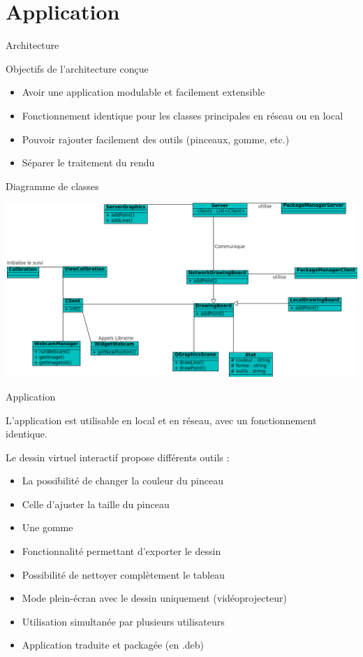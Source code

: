 \documentclass{beamer}
\begin{document}
	\section{Application}
		\begin{frame}{Architecture}
			\begin{block}{Objectifs de l'architecture conçue}
				\begin{itemize}
				\item{Avoir une application modulable et facilement extensible}
				\item{Fonctionnement identique pour les classes principales en réseau ou en local}
				\item{Pouvoir rajouter facilement des outils (pinceaux, gomme, etc.)}
				\item{Séparer le traitement du rendu}
				\end{itemize}
			\end{block}
		\end{frame}
		
		\begin{frame}{Diagramme de classes}
			\begin{center}		
			\includegraphics[scale=0.45]{../uml/classes.png}
			\end{center}
		\end{frame}
		
		\begin{frame}{Application}
			
			L'application est utilisable en local et en réseau, avec un fonctionnement identique.
			
			Le dessin virtuel interactif propose différents outils :
			\begin{itemize}
			\item La possibilité de changer la couleur du pinceau
      \item Celle d'ajuster la taille du pinceau
			\item Une gomme
			\item Fonctionnalité permettant d'exporter le dessin
			\item Possibilité de nettoyer complètement le tableau
			\item Mode plein-écran avec le dessin uniquement (vidéoprojecteur)
			\item Utilisation simultanée par plusieurs utilisateurs
			\item Application traduite et packagée (en .deb)
			\end{itemize}
		\end{frame}
		
\end{document}
